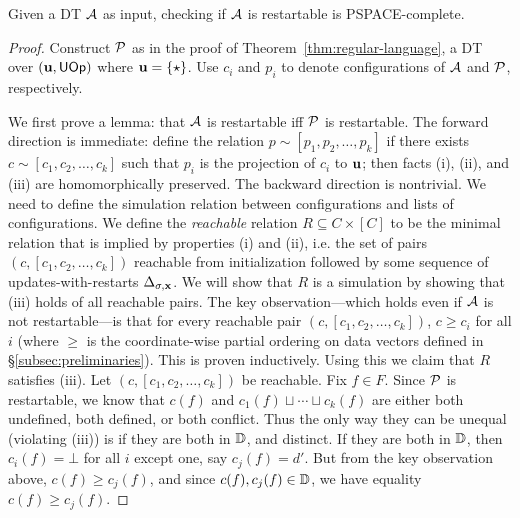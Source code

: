 \begin{theorem}
Given a DT $\mathcal{A}$ as input,
checking if $\mathcal{A}$ is restartable is PSPACE-complete.
\label{thm:restartable-pspace-complete}
\end{theorem}
\begin{proof}
Construct $\mathcal{P}$ as in the proof of Theorem~\ref{thm:regular-language}, a DT over $(\textbf{u}, \textsf{UOp})$ where $\textbf{u} = \{\star\}$.
Use $c_i$ and $p_i$ to denote configurations of $\mathcal{A}$ and $\mathcal{P}$, respectively.

We first prove a lemma: that $\mathcal{A}$ is restartable iff $\mathcal{P}$ is restartable.
The forward direction is immediate:
define the relation $p \sim [p_1, p_2, \ldots, p_k]$
if there exists $c \sim [c_1, c_2, \ldots, c_k]$
such that $p_i$ is the projection of $c_i$ to $\textbf{u}$;
then facts (i), (ii), and (iii) are homomorphically preserved.
The backward direction is nontrivial.
We need to define the simulation relation
between configurations and lists of configurations.
We define the \emph{reachable} relation $R \subseteq C \times [C]$
to be the minimal relation that is implied by properties (i) and (ii), i.e. the set of pairs
$(c, [c_1, c_2, \ldots, c_k])$ reachable from initialization followed
by some sequence of updates-with-restarts $\Delta_{\sigma,\textbf{x}}$.
We will show that $R$ is a simulation by showing that
(iii) holds of all reachable pairs.
The key observation---which holds even if
$\mathcal{A}$ is not restartable---is that for every reachable pair
$(c, [c_1, c_2, \ldots, c_k])$,
$c \ge c_i$ for all $i$ (where $\ge$ is the coordinate-wise partial ordering on data vectors defined in \S\ref{subsec:preliminaries}).
This is proven inductively.
Using this we claim that $R$ satisfies (iii).
Let $(c, [c_1, c_2, \ldots, c_k])$ be reachable.
Fix $f \in F$.
Since $\mathcal{P}$ is restartable, we know that
$c(f)$ and $c_1(f) \sqcup \cdots \sqcup c_k(f)$ are either both undefined, both defined, or both conflict.
Thus the only way they can be unequal (violating (iii)) is if they are both in $\mathbb{D}$, and distinct.
If they are both in $\mathbb{D}$, then $c_i(f) = \bot$ for all $i$ except one, say $c_j(f) = d'$.
But from the key observation above, $c(f) \ge c_j(f)$, and since $c(f), c_j(f) \in \mathbb{D}$, we have equality $c(f) \ge c_j(f)$.


\end{proof}
